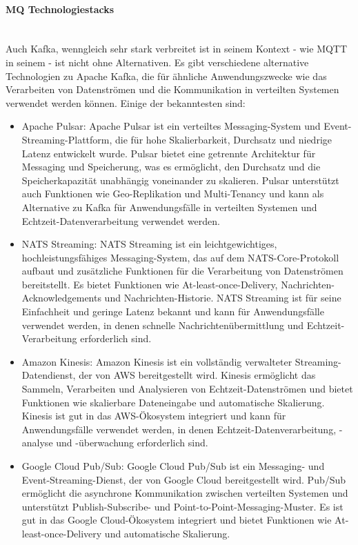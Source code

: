 \documentclass[../vs-script-first-v01.tex]{subfiles}
\begin{document}
\paragraph{MQ Technologiestacks\\\\}
Auch Kafka, wenngleich sehr stark verbreitet ist in seinem Kontext - wie MQTT in seinem - ist nicht ohne Alternativen. Es gibt verschiedene alternative Technologien zu Apache Kafka, die für ähnliche Anwendungszwecke wie das Verarbeiten von Datenströmen und die Kommunikation in verteilten Systemen verwendet werden können. Einige der bekanntesten sind:
\begin{itemize}
\item Apache Pulsar: Apache Pulsar ist ein verteiltes Messaging-System und Event-Streaming-Plattform, die für hohe Skalierbarkeit, Durchsatz und niedrige Latenz entwickelt wurde. Pulsar bietet eine getrennte Architektur für Messaging und Speicherung, was es ermöglicht, den Durchsatz und die Speicherkapazität unabhängig voneinander zu skalieren. Pulsar unterstützt auch Funktionen wie Geo-Replikation und Multi-Tenancy und kann als Alternative zu Kafka für Anwendungsfälle in verteilten Systemen und Echtzeit-Datenverarbeitung verwendet werden.
\item NATS Streaming: NATS Streaming ist ein leichtgewichtiges, hochleistungsfähiges Messaging-System, das auf dem NATS-Core-Protokoll aufbaut und zusätzliche Funktionen für die Verarbeitung von Datenströmen bereitstellt. Es bietet Funktionen wie At-least-once-Delivery, Nachrichten-Acknowledgements und Nachrichten-Historie. NATS Streaming ist für seine Einfachheit und geringe Latenz bekannt und kann für Anwendungsfälle verwendet werden, in denen schnelle Nachrichtenübermittlung und Echtzeit-Verarbeitung erforderlich sind.
\item Amazon Kinesis: Amazon Kinesis ist ein vollständig verwalteter Streaming-Datendienst, der von AWS bereitgestellt wird. Kinesis ermöglicht das Sammeln, Verarbeiten und Analysieren von Echtzeit-Datenströmen und bietet Funktionen wie skalierbare Dateneingabe und automatische Skalierung. Kinesis ist gut in das AWS-Ökosystem integriert und kann für Anwendungsfälle verwendet werden, in denen Echtzeit-Datenverarbeitung, -analyse und -überwachung erforderlich sind.
\item Google Cloud Pub/Sub: Google Cloud Pub/Sub ist ein Messaging- und Event-Streaming-Dienst, der von Google Cloud bereitgestellt wird. Pub/Sub ermöglicht die asynchrone Kommunikation zwischen verteilten Systemen und unterstützt Publish-Subscribe- und Point-to-Point-Messaging-Muster. Es ist gut in das Google Cloud-Ökosystem integriert und bietet Funktionen wie At-least-once-Delivery und automatische Skalierung.
\end{itemize}
\end{document}
